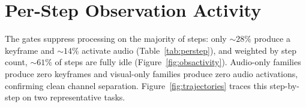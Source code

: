 \documentclass[11pt]{article}
\begin{document}
\section{Per-Step Observation Activity}
\label{app:perstep}

The gates suppress processing on the majority of steps: only ${\sim}28\%$ produce
a keyframe and ${\sim}14\%$ activate audio (Table~\ref{tab:perstep}), and
weighted by step count, ${\sim}61\%$ of steps are fully idle
(Figure~\ref{fig:obsactivity}). Audio-only families produce zero keyframes and
visual-only families produce zero audio activations, confirming clean channel separation.
Figure~\ref{fig:trajectories} traces this step-by-step on two representative tasks.
\end{document}
